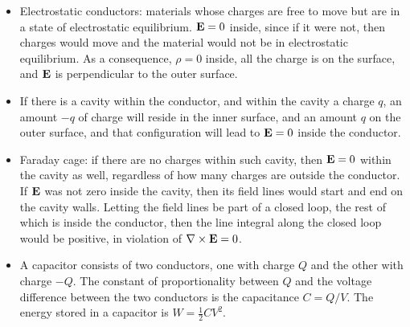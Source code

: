 \documentclass[11pt]{article}
\begin{document}
\begin{itemize}
\item Electrostatic conductors: materials whose charges are free to move but are in a state of electrostatic equilibrium. $\mathbf{E} = 0$ inside, since if it were not, then charges would move and the material would not be in electrostatic equilibrium. As a consequence, $\rho = 0$ inside, all the charge is on the surface, and $\mathbf{E}$ is perpendicular to the outer surface.

\item If there is a cavity within the conductor, and within the cavity a charge $q$, an amount $-q$ of charge will reside in the inner surface, and an amount $q$ on the outer surface, and that configuration will lead to $\mathbf{E} = 0$ inside the conductor.

\item Faraday cage: if there are no charges within such cavity, then $\mathbf{E} = 0$ within the cavity as well, regardless of how many charges are outside the conductor. If $\mathbf{E}$ was not zero inside the cavity, then its field lines would start and end on the cavity walls. Letting the field lines be part of a closed loop, the rest of which is inside the conductor, then the line integral along the closed loop would be positive, in violation of $\nabla \times \mathbf{E} = 0$.

\item A capacitor consists of two conductors, one with charge $Q$ and the other with charge $-Q$. The constant of proportionality between $Q$ and the voltage difference between the two conductors is the capacitance $C = Q/V$. The energy stored in a capacitor is $W = \frac{1}{2} CV^2$.

\end{itemize}

\end{document}
